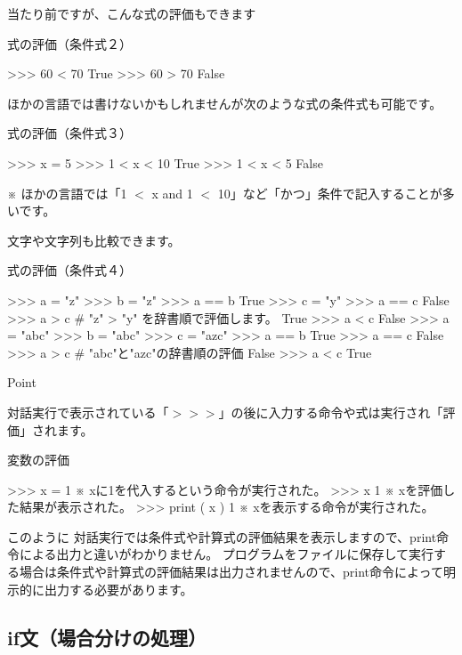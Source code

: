\documentclass[11pt,a4paper,dvipdfmx,titlepage]{jsreport}
\begin{document}
当たり前ですが、こんな式の評価もできます
\begin{grabox}{式の評価（条件式２）}
\begin{listingcont}
>>> 60 < 70
True
>>> 60 > 70
False
\end{listingcont}
\end{grabox}
ほかの言語では書けないかもしれませんが次のような式の条件式も可能です。
\begin{grabox}{{式の評価（条件式３）}}
\begin{listing}{1}
>>> x = 5
>>> 1 < x < 10
True
>>> 1 < x < 5
False
\end{listing}
\end{grabox}
※ ほかの言語では「1 $<$ x and 1 $<$ 10」など「かつ」条件で記入することが多いです。

文字や文字列も比較できます。
\begin{grabox}{{式の評価（条件式４）}}
\begin{listing}{1}
>>> a = "z"
>>> b = "z"
>>> a == b
True
>>> c = "y"
>>> a == c
False
>>> a > c # "z" > "y" を辞書順で評価します。
True
>>> a < c
False
>>> a = "abc"
>>> b = "abc"
>>> c = "azc"
>>> a == b
True
>>> a == c
False
>>> a > c # "abc"と"azc"の辞書順の評価
False
>>> a < c
True
\end{listing}
\end{grabox}


\begin{hipoint}{Point}

 {\gt 対話実行}で表示されている「$>>>$」の後に入力する命令や式は実行され「評価」されます。
\end{hipoint}

\begin{grabox}{変数の評価}
\begin{listing}{1}
>>> x = 1
※ xに1を代入するという命令が実行された。
>>> x
1
※ xを評価した結果が表示された。
>>> print ( x )
1
※ xを表示する命令が実行された。
\end{listing}
\end{grabox}

このように {\gt 対話実行}では条件式や計算式の評価結果を表示しますので、print命令による出力と違いがわかりません。
プログラムをファイルに保存して実行する場合は条件式や計算式の評価結果は出力されませんので、print命令によって明示的に出力する必要があります。

\subsection{if文（場合分けの処理）}
\end{document}
